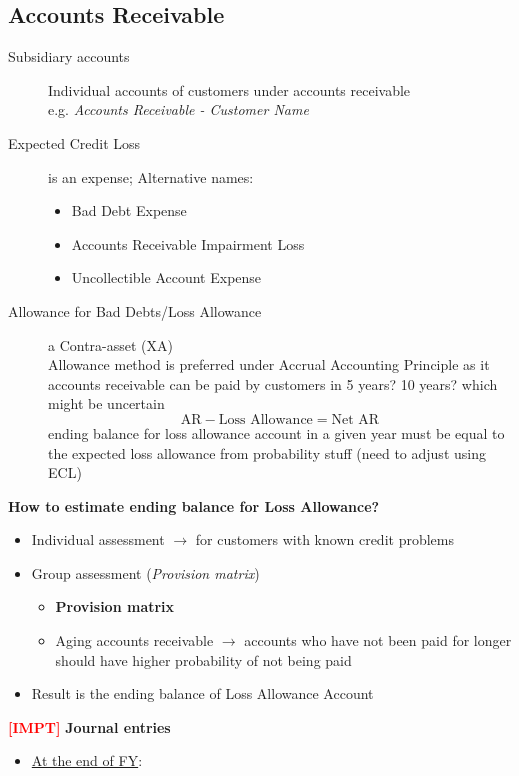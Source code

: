 \documentclass{article}
\newcommand{\impt}[0]{\textcolor{red}{\textbf{[IMPT] }}}
\begin{document}
\begin{multicols}{2}
\subsection{Accounts Receivable}
\begin{description}
	\item[Subsidiary accounts] Individual accounts of customers under accounts receivable\\
	e.g. \textit{Accounts Receivable - Customer Name}
	\item[Expected Credit Loss] is an expense; Alternative names:
	\begin{itemize}
		\item Bad Debt Expense
		\item Accounts Receivable Impairment Loss
		\item Uncollectible Account Expense
	\end{itemize}
    \item[Allowance for Bad Debts/Loss Allowance] a Contra-asset (XA)\\
    Allowance method is preferred under Accrual Accounting Principle as it accounts receivable can be paid by customers in 5 years? 10 years? which might be uncertain
    $$\text{AR} - \text{Loss Allowance} = \text{Net AR}$$
    ending balance for loss allowance account in a given year must be equal to the expected loss allowance from probability stuff (need to adjust using ECL)
\end{description}
\textbf{How to estimate ending balance for Loss Allowance?}
\begin{itemize}
	\item Individual assessment $\rightarrow$ for customers with known credit problems
	\item Group assessment (\textit{Provision matrix})
	\begin{itemize}
		\item \textbf{Provision matrix}
		\item Aging accounts receivable $\rightarrow$ accounts who have not been paid for longer should have higher probability of not being paid
	\end{itemize}
    \item Result is the ending balance of Loss Allowance Account
\end{itemize}
\impt \textbf{Journal entries}\vspace{0.5em}
\begin{itemize}
	\item \underline{At the end of FY}:\vspace{0.5em}\\

\end{itemize}
\end{multicols}
\end{document}
